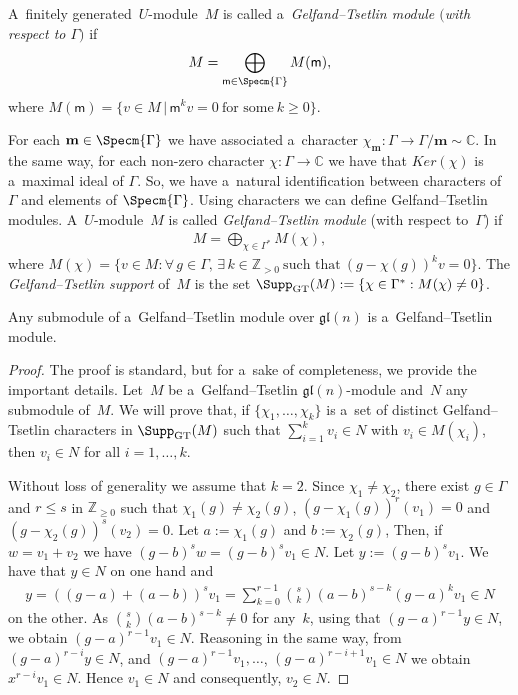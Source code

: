 \begin{Definition}
A~f\/initely generated~$U$-module~$M$ is called a~\emph{Gelfand--Tsetlin module $($with respect to ${\Gamma})$} if
\begin{gather*}
M=\bigoplus_{\mathsf m\in\Specm{\Gamma}}M(\mathsf m),
\end{gather*}
where $M(\mathsf m)=\{v\in M\,|\, \mathsf m^{k}v=0~\text{for some}~k\geq 0\}$.
\end{Definition}

For each $\mathbf m\in\Specm{\Gamma}$ we have associated a~character $\chi_{\mathbf m}:{\Gamma}\rightarrow{\Gamma}/\mathbf
m\sim\mathbb{C}$.
In the same way, for each non-zero character $\chi:{\Gamma}\rightarrow\mathbb{C}$ we have that $Ker(\chi)$ is a~maximal
ideal of ${\Gamma}$.
So, we have a~natural identif\/ication between characters of ${\Gamma}$ and elements of $\Specm{\Gamma}$.
Using characters we can def\/ine Gelfand--Tsetlin modules.
A~$U$-module~$M$ is called \emph{Gelfand--Tsetlin module} (with respect to~$\Gamma$) if
\begin{gather*}
M=\bigoplus_{\chi\in\Gamma^{*}}M(\chi),
\end{gather*}
where $M(\chi)=\{v\in M: \forall\, g\in\Gamma, \, \exists\, k\in\mathbb{Z}_{>0}~\text{such that}~(g-\chi(g))^{k}v=0 \}$.
The {\it Gelfand--Tsetlin support} of~$M$ is the set $\Supp_{\rm GT}(M):=\{\chi\in{\Gamma}^{*}:M(\chi)\neq 0\}$.

\begin{Lemma}
\label{lemma elements of Gamma separates tableaux}
Any submodule of a~Gelfand--Tsetlin module over $\mathfrak{gl}(n)$ is a~Gelfand--Tsetlin mo\-dule.
\end{Lemma}

\begin{proof}
The proof is standard, but for a~sake of completeness, we provide the important details.
Let~$M$ be a~Gelfand--Tsetlin $\mathfrak{gl}(n)$-module and~$N$ any submodule of~$M$.
We will prove that, if $\{\chi_{1},\dots,\chi_{k} \}$ is a~set of distinct Gelfand--Tsetlin characters in
$\Supp_{\rm GT}(M)$ such that $\sum\limits_{i=1}^{k}v_{i}\in N$ with $v_{i}\in M(\chi_{i})$, then $v_{i}\in N$ for all
$i=1,\ldots,k$.

Without loss of generality we assume that $k=2$.
Since $\chi_{1}\neq\chi_{2}$, there exist $g\in\Gamma$ and $r\leq s$ in $\mathbb{Z}_{\geq 0}$ such that
$\chi_{1}(g)\neq\chi_{2}(g)$, $(g-\chi_{1}(g))^{r}(v_{1})=0$ and $(g-\chi_{2}(g))^{s}(v_{2})=0$.
Let $a:=\chi_{1}(g)$ and $b:= \chi_{2}(g)$, Then, if $w=v_{1}+v_{2}$ we have $(g-b)^{s}w=(g-b)^{s}v_{1}\in N$.
Let $y:= (g-b)^sv_1$.
We have that $y \in N$ on one hand and
\begin{gather*}
y=((g-a)+(a-b))^{s}v_{1}=\sum\limits_{k=0}^{r-1} {s\choose k}(a-b)^{s-k}(g-a)^{k}v_{1}\in N
\end{gather*}
on the other.
As ${s\choose k}(a-b)^{s-k}\neq 0$ for any~$k$, using that $(g-a)^{r-1}y\in N$, we obtain \mbox{$(g-a)^{r-1}v_1\in N$}.
Reasoning in the same way, from $(g-a)^{r-i}y\in N$, and $(g-a)^{r-1}v_{1},\ldots$, $(g-a)^{r-i+1}v_{1}\in N $ we obtain $
x^{r-i}v_{1}\in N$.
Hence $v_{1}\in N$ and consequently, $v_{2}\in N$.
\end{proof}

